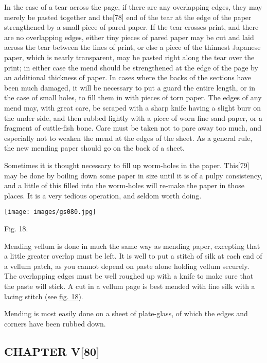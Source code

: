\documentclass[
]{article}
\begin{document}
In the case of a tear across the page, if there are any overlapping
edges, they may merely be pasted together and
the{\protect\hypertarget{Page_78}{}{{[}78{]}}} end of the tear at the
edge of the paper strengthened by a small piece of pared paper. If the
tear crosses print, and there are no overlapping edges, either tiny
pieces of pared paper may be cut and laid across the tear between the
lines of print, or else a piece of the thinnest Japanese paper, which is
nearly transparent, may be pasted right along the tear over the print;
in either case the mend should be strengthened at the edge of the page
by an additional thickness of paper. In cases where the backs of the
sections have been much damaged, it will be necessary to put a guard the
entire length, or in the case of small holes, to fill them in with
pieces of torn paper. The edges of any mend may, with great care, be
scraped with a sharp knife having a slight burr on the under side, and
then rubbed lightly with a piece of worn fine sand-paper, or a fragment
of cuttle-fish bone. Care must be taken not to pare away too much, and
especially not to weaken the mend at the edges of the sheet. As a
general rule, the new mending paper should go on the back of a sheet.

Sometimes it is thought necessary to fill up worm-holes in the paper.
This{\protect\hypertarget{Page_79}{}{{[}79{]}}} may be done by boiling
down some paper in size until it is of a pulpy consistency, and a little
of this filled into the worm-holes will re-make the paper in those
places. It is a very tedious operation, and seldom worth doing.

\protect\hypertarget{Fig_18}{}{}
\texttt{[image: images/gs080.jpg]}

Fig. 18.

Mending vellum is done in much the same way as mending paper, excepting
that a little greater overlap must be left. It is well to put a stitch
of silk at each end of a vellum patch, as you cannot depend on paste
alone holding vellum securely. The overlapping edges must be well
roughed up with a knife to make sure that the paste will stick. A cut in
a vellum page is best mended with fine silk with a lacing stitch (see
\protect\hyperlink{Fig_18}{fig. 18}).

Mending is most easily done on a sheet of plate-glass, of which the
edges and corners have been rubbed down.

\hypertarget{chapter-v80}{%
\subsection[CHAPTER
V]{\texorpdfstring{\protect\hypertarget{CHAPTER_V}{}{}CHAPTER
V{\protect\hypertarget{Page_80}{}{{[}80{]}}}}{CHAPTER V{[}80{]}}}\label{chapter-v80}}
\end{document}
